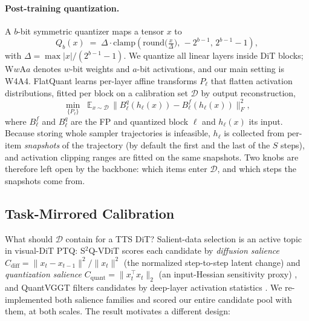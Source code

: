 \paragraph{Post-training quantization.}
A $b$-bit symmetric quantizer maps a tensor $x$ to
\begin{equation}
Q_b(x) \;=\; \Delta\cdot\mathrm{clamp}\!\left(\mathrm{round}\!\big(\tfrac{x}{\Delta}\big),\, -2^{b-1},\, 2^{b-1}{-}1\right),
\label{eq:quant}
\end{equation}
with $\Delta=\max|x|/(2^{b-1}{-}1)$. We quantize all linear layers inside DiT blocks; W$w$A$a$ denotes $w$-bit weights and $a$-bit activations, and our main setting is W4A4. FlatQuant \citep{sun2025flatquant} learns per-layer affine transforms $P_\ell$ that flatten activation distributions, fitted per block on a calibration set $\mathcal{D}$ by output reconstruction,
\begin{equation}
\min_{\{P_\ell\}} \;\; \mathbb{E}_{x\sim\mathcal{D}}\, \big\| B^{q}_{\ell}(h_\ell(x)) - B^{f}_{\ell}(h_\ell(x)) \big\|_F^2 ,
\label{eq:calib}
\end{equation}
where $B^{f}_\ell$ and $B^{q}_\ell$ are the FP and quantized block $\ell$ and $h_\ell(x)$ its input. Because storing whole sampler trajectories is infeasible, $h_\ell$ is collected from per-item \emph{snapshots} of the trajectory (by default the first and the last of the $S$ steps), and activation clipping ranges are fitted on the same snapshots. Two knobs are therefore left open by the backbone: which items enter $\mathcal{D}$, and which steps the snapshots come from.

\subsection{Task-Mirrored Calibration}
\label{sec:tmc}

What should $\mathcal{D}$ contain for a TTS DiT? Salient-data selection is an active topic in visual-DiT PTQ: S$^2$Q-VDiT scores each candidate by \emph{diffusion salience} $C_\text{diff}=\lVert x_t-x_{t-1}\rVert^{2}/\lVert x_t\rVert^{2}$ (the normalized step-to-step latent change) and \emph{quantization salience} $C_\text{quant}=\lVert x_t^{\top}x_t\rVert_{2}$ (an input-Hessian sensitivity proxy) \citep{feng2025s2qvdit}, and QuantVGGT filters candidates by deep-layer activation statistics \citep{feng2026quantvggt}. We re-implemented both salience families and scored our entire candidate pool with them, at both scales. The result motivates a different design:

